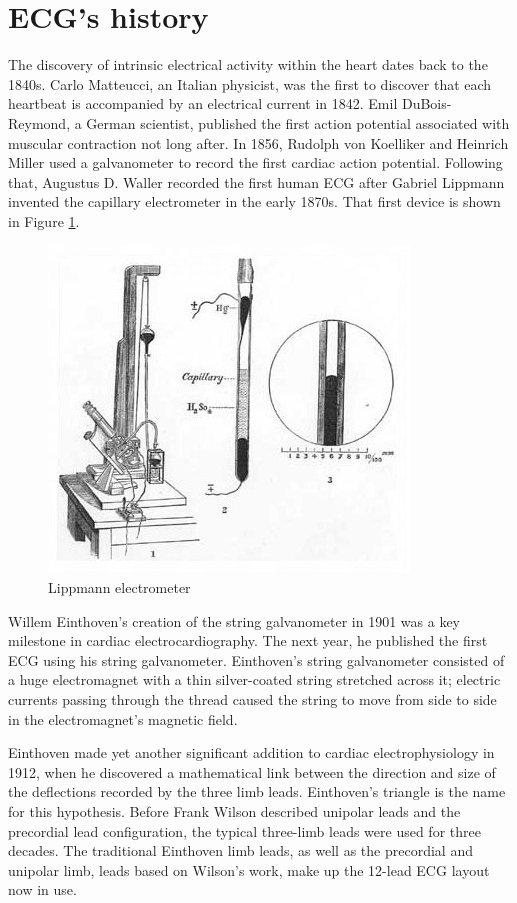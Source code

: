 \section{ECG's history} \label{ecg_history}

The discovery of intrinsic electrical activity within the heart dates back to the 1840s. Carlo Matteucci, an Italian physicist, was the first to discover that each heartbeat is accompanied by an electrical current in 1842. Emil DuBois-Reymond, a German scientist, published the first action potential associated with muscular contraction not long after. In 1856, Rudolph von Koelliker and Heinrich Miller used a galvanometer to record the first cardiac action potential. Following that, Augustus D. Waller recorded the first human ECG after Gabriel Lippmann invented the capillary electrometer in the early 1870s. That first device is shown in Figure \ref{fig:Kapillarelektrometer}.

\begin{figure}[H]
\centering
\includegraphics[scale=0.5]{img/Kapillarelektrometer.jpg}
\caption{Lippmann electrometer}
\label{fig:Kapillarelektrometer}
\end{figure}

Willem Einthoven's creation of the string galvanometer in 1901 was a key milestone in cardiac electrocardiography. The next year, he published the first ECG using his string galvanometer. Einthoven's string galvanometer consisted of a huge electromagnet with a thin silver-coated string stretched across it; electric currents passing through the thread caused the string to move from side to side in the electromagnet's magnetic field.


Einthoven made yet another significant addition to cardiac electrophysiology in 1912, when he discovered a mathematical link between the direction and size of the deflections recorded by the three limb leads. Einthoven's triangle is the name for this hypothesis. Before Frank Wilson described unipolar leads and the precordial lead configuration, the typical three-limb leads were used for three decades. The traditional Einthoven limb leads, as well as the precordial and unipolar limb, leads based on Wilson's work, make up the 12-lead ECG layout now in use.


